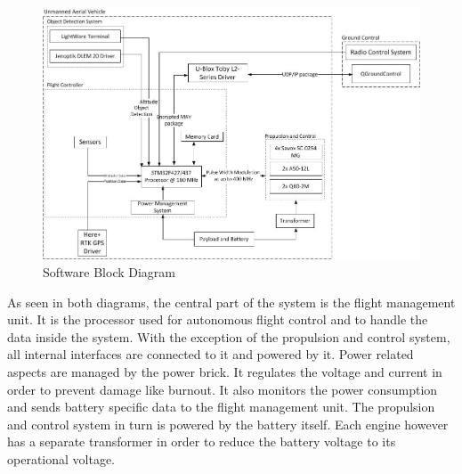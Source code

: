 \begin{figure}[h]
    \centering
    \includegraphics[width=.8\textwidth]{./CommandDataHandling/Figures/SWdiagram.jpg}
    \caption{Software Block Diagram}
    \label{fig:swdia}
\end{figure}

As seen in both diagrams, the central part of the system is the flight management unit. It is the processor used for autonomous flight control and to handle the data inside the system. With the exception of the propulsion and control system, all internal interfaces are connected to it and powered by it. Power related aspects are managed by the power brick. It regulates the voltage and current in order to prevent damage like burnout. It also monitors the power consumption and sends battery specific data to the flight management unit. 
The propulsion and control system in turn is powered by the battery itself. Each engine however has a separate transformer in order to reduce the battery voltage to its operational voltage. 